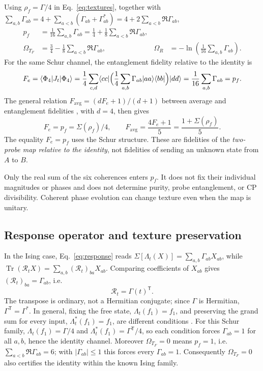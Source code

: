 \documentclass[11pt,a4paper]{article}
\newcommand{\ket}[1]{\lvert #1\rangle}
\newcommand{\bra}[1]{\langle #1\rvert}
\newcommand{\Tr}{\operatorname{Tr}}
\newcommand{\OmF}{\Omega_{T_F}}
\newcommand{\OmR}{\Omega_R}
\begin{document}
Using $\rho_f=\Gamma/4$ in Eq.~\eqref{eq:textures}, together with
$\sum_{a,b}\Gamma_{ab}=4+\sum_{a<b}(\Gamma_{ab}+\Gamma_{ab}^*)
=4+2\sum_{a<b}\Re\Gamma_{ab}$,
\begin{align}
 p_f&=\frac1{16}\sum_{a,b}\Gamma_{ab}
     =\frac14+\frac18\sum_{a<b}\Re\Gamma_{ab},\\
 \OmF&=\frac34-\frac18\sum_{a<b}\Re\Gamma_{ab},
 &\OmR&=-\ln\!\left(\frac1{16}\sum_{a,b}\Gamma_{ab}\right).
 \label{eq:omegazz}
\end{align}
For the same Schur channel, the entanglement fidelity relative to the
identity is
\begin{equation}
 F_e=\bra{\Phi_4}J_t\ket{\Phi_4}
 =\frac14\sum_{c,d}\bra{cc}\Bigl(\frac14\sum_{a,b}\Gamma_{ab}\ket{aa}\bra{bb}\Bigr)\ket{dd}
 =\frac1{16}\sum_{a,b}\Gamma_{ab}=p_f .
\end{equation}
The general relation $F_{\mathrm{avg}}=(dF_e+1)/(d+1)$ between average
and entanglement fidelities \cite{Nielsen2002}, with $d=4$, then gives
\begin{equation}
 \boxed{F_e=p_f=\Sigma(\rho_f)/4,\qquad
 F_{\mathrm{avg}}=\frac{4F_e+1}{5}
                 =\frac{1+\Sigma(\rho_f)}5.}
 \label{eq:fidelities}
\end{equation}
The equality $F_e=p_f$ uses the Schur structure.
These are fidelities of the \emph{two-probe map relative to the identity},
not fidelities of sending an unknown state from $A$ to $B$.

Only the real sum of the six coherences enters $p_f$. It does not fix
their individual magnitudes or phases and does not determine purity,
probe entanglement, or CP divisibility. Coherent phase evolution can
change texture even when the map is unitary.

\subsection{Response operator and texture preservation}

In the Ising case, Eq.~\eqref{eq:response} reads
$\Sigma[\Lambda_t(X)]=\sum_{a,b}\Gamma_{ab}X_{ab}$, while
$\Tr(\mathcal R_tX)=\sum_{a,b}(\mathcal R_t)_{ba}X_{ab}$. Comparing
coefficients of $X_{ab}$ gives $(\mathcal R_t)_{ba}=\Gamma_{ab}$, i.e.
\begin{equation}
 \mathcal R_t=\Gamma(t)^{\mathsf T}.
 \label{eq:responsetranspose}
\end{equation}
The transpose is ordinary, not a Hermitian conjugate; since $\Gamma$ is
Hermitian, $\Gamma^{\mathsf T}=\Gamma^*$. In general, fixing the free
state, $\Lambda_t(f_1)=f_1$, and preserving the grand sum for every input,
$\Lambda_t^*(f_1)=f_1$, are different conditions \cite{Vieira2026}. For
this Schur family, $\Lambda_t(f_1)=\Gamma/4$ and
$\Lambda_t^*(f_1)=\Gamma^{\mathsf T}/4$, so each condition forces
$\Gamma_{ab}=1$ for all $a,b$, hence the identity channel.
Moreover $\OmF=0$ means $p_f=1$, i.e.\ $\sum_{a<b}\Re\Gamma_{ab}=6$; with
$|\Gamma_{ab}|\le1$ this forces every $\Gamma_{ab}=1$. Consequently
$\OmF=0$ also certifies the identity within the known Ising family.
\end{document}
